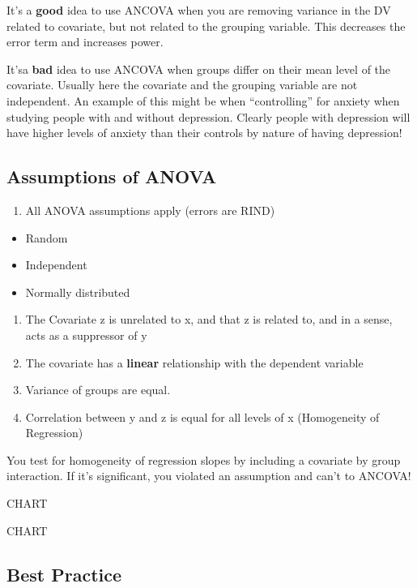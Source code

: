 \documentclass[]{book}
\providecommand{\tightlist}{%
  \setlength{\itemsep}{0pt}\setlength{\parskip}{0pt}}
\theoremstyle{definition}
\theoremstyle{definition}
\theoremstyle{definition}
\theoremstyle{remark}
\begin{document}
It's a \textbf{good} idea to use ANCOVA when you are removing variance
in the DV related to covariate, but not related to the grouping
variable. This decreases the error term and increases power.

It'sa \textbf{bad} idea to use ANCOVA when groups differ on their mean
level of the covariate. Usually here the covariate and the grouping
variable are not independent. An example of this might be when
``controlling'' for anxiety when studying people with and without
depression. Clearly people with depression will have higher levels of
anxiety than their controls by nature of having depression!

\subsection{Assumptions of ANOVA}\label{assumptions-of-anova-2}

\begin{enumerate}
\def\labelenumi{\arabic{enumi}.}
\tightlist
\item
  All ANOVA assumptions apply (errors are RIND)
\end{enumerate}

\begin{itemize}
\tightlist
\item
  Random
\item
  Independent
\item
  Normally distributed
\end{itemize}

\begin{enumerate}
\def\labelenumi{\arabic{enumi}.}
\setcounter{enumi}{1}
\tightlist
\item
  The Covariate z is unrelated to x, and that z is related to, and in a
  sense, acts as a suppressor of y
\item
  The covariate has a \textbf{linear} relationship with the dependent
  variable
\item
  Variance of groups are equal.
\item
  Correlation between y and z is equal for all levels of x (Homogeneity
  of Regression)
\end{enumerate}

You test for homogeneity of regression slopes by including a covariate
by group interaction. If it's significant, you violated an assumption
and can't to ANCOVA!

CHART

CHART

\subsection{Best Practice}\label{best-practice}
\end{document}
